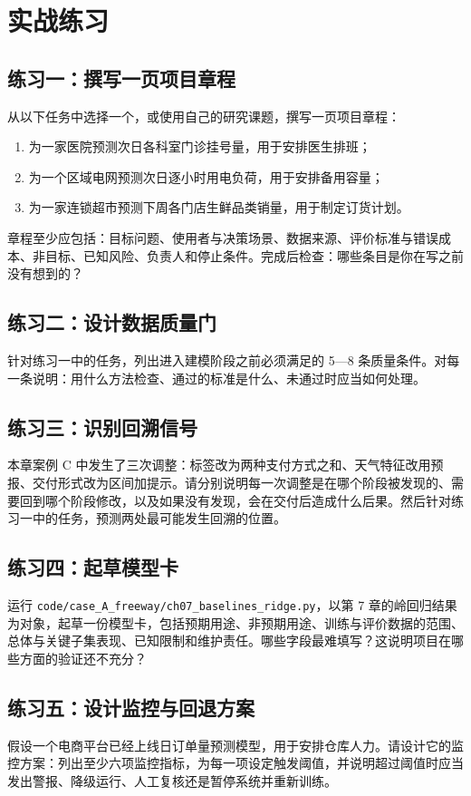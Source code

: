 \section{实战练习}

\subsection*{练习一：撰写一页项目章程}

从以下任务中选择一个，或使用自己的研究课题，撰写一页项目章程：

\begin{enumerate}
  \item 为一家医院预测次日各科室门诊挂号量，用于安排医生排班；
  \item 为一个区域电网预测次日逐小时用电负荷，用于安排备用容量；
  \item 为一家连锁超市预测下周各门店生鲜品类销量，用于制定订货计划。
\end{enumerate}

章程至少应包括：目标问题、使用者与决策场景、数据来源、评价标准与错误成本、非目标、已知风险、负责人和停止条件。完成后检查：哪些条目是你在写之前没有想到的？

\subsection*{练习二：设计数据质量门}

针对练习一中的任务，列出进入建模阶段之前必须满足的 5—8 条质量条件。对每一条说明：用什么方法检查、通过的标准是什么、未通过时应当如何处理。

\subsection*{练习三：识别回溯信号}

本章案例 C 中发生了三次调整：标签改为两种支付方式之和、天气特征改用预报、交付形式改为区间加提示。请分别说明每一次调整是在哪个阶段被发现的、需要回到哪个阶段修改，以及如果没有发现，会在交付后造成什么后果。然后针对练习一中的任务，预测两处最可能发生回溯的位置。

\subsection*{练习四：起草模型卡}

运行 \texttt{code/case\_A\_freeway/ch07\_baselines\_ridge.py}，以第 7 章的岭回归结果为对象，起草一份模型卡，包括预期用途、非预期用途、训练与评价数据的范围、总体与关键子集表现、已知限制和维护责任。哪些字段最难填写？这说明项目在哪些方面的验证还不充分？

\subsection*{练习五：设计监控与回退方案}

假设一个电商平台已经上线日订单量预测模型，用于安排仓库人力。请设计它的监控方案：列出至少六项监控指标，为每一项设定触发阈值，并说明超过阈值时应当发出警报、降级运行、人工复核还是暂停系统并重新训练。
